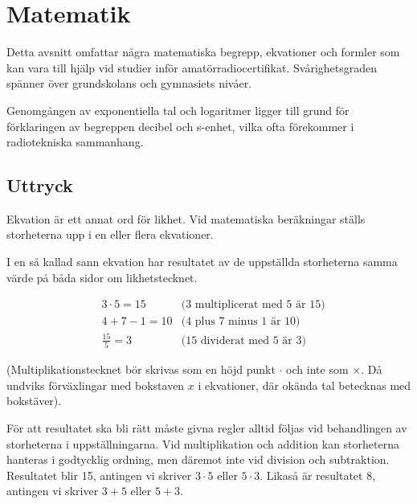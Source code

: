 \chapter{Matematik}


\noindent
Detta avsnitt omfattar några matematiska begrepp, ekvationer och formler som kan
vara till hjälp vid studier inför amatörradiocertifikat.
Svårighetsgraden spänner över grundskolans och gymnasiets nivåer.

Genomgången av exponentiella tal och logaritmer ligger till grund för
förklaringen av begreppen decibel och s-enhet, vilka ofta förekommer i
radiotekniska sammanhang.

\section{Uttryck}

Ekvation är ett annat ord för likhet.
Vid matematiska beräkningar ställs storheterna upp i en eller flera ekvationer.

I en så kallad sann ekvation har resultatet av de uppställda storheterna samma %
värde på båda sidor om likhetstecknet.

\begin{exempelbox}
\begin{align*}
 & 3 \cdot 5 = 15   & \text{(3 multiplicerat med 5 är 15)} \\
 & 4 + 7 - 1 = 10   & \text{(4 plus 7 minus 1 är 10)}      \\
 & \frac{15}{5} = 3 & \text{(15 dividerat med 5 är 3)}
\end{align*}
\end{exempelbox}

(Multiplikationstecknet bör skrivas som en höjd punkt \(\cdot\) och inte som
\(\times\).
Då undviks förväxlingar med bokstaven \(x\) i ekvationer, där okända tal
betecknas med bokstäver).

För att resultatet ska bli rätt måste givna regler alltid följas vid
behandlingen av storheterna i uppställningarna.
Vid multiplikation och addition kan storheterna hanteras i godtycklig ordning,
men däremot inte vid division och subtraktion.
Resultatet blir 15, antingen vi skriver \(3 \cdot 5\) eller \(5 \cdot 3\).
Likaså är resultatet 8, antingen vi skriver \(3 + 5\) eller \(5 + 3\).

